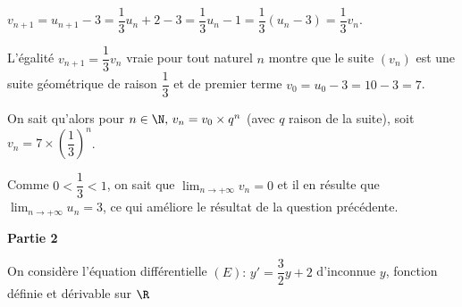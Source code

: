 \begin{enumerate}
$v_{n+1} = u_{n+1} - 3 = \dfrac13u_n + 2 - 3 = \dfrac13u_n - 1 = \dfrac13(u_n - 3) = \dfrac13v_n$.

L'égalité $v_{n+1} = \dfrac13v_n$ vraie pour tout naturel $n$ montre que le suite $(v_n)$ est une suite géométrique de raison $\dfrac13$ et de premier terme $v_0 = u_0 - 3 = 10 - 3 = 7$.

On sait qu'alors pour $n \in \N, \, v_n = v_0 \times q^n$ (avec $q$ raison de la suite), soit $v_n = 7\times \left(\dfrac13\right)^n$.

Comme $0 < \dfrac13 < 1$, on sait que $\displaystyle\lim_{n \to + \infty} v_n = 0$ et il en résulte que $\displaystyle\lim_{n \to + \infty} u_n = 3$, ce qui améliore le résultat de la question précédente.
\end{enumerate}

\medskip

\textbf{Partie 2}

\medskip

On considère l'équation différentielle $(E) :\, y' = \dfrac32 y + 2$ d'inconnue $y$, fonction définie et 
dérivable sur $\R$

\medskip

